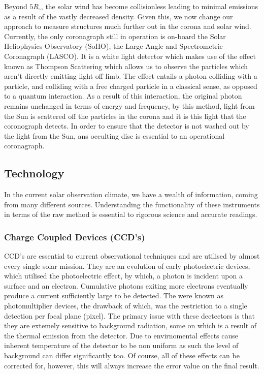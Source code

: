 Beyond $5 R_\circ$, the solar wind has become collisionless leading to minimal emissions as a result of the vastly decreased density.
Given this, we now change our approach to measure structures much further out in the corona and solar wind.
Currently, the only coronagraph still in operation is on-board the Solar Heliophysics Observatory (SoHO), the Large Angle and Spectrometric Coronagraph (LASCO). 
It is a white light detector which makes use of the effect known as Thompson Scattering which allows us to observe the particles which aren't directly emitting light off limb.
The effect entails a photon colliding with a particle, and colliding with a free charged particle in a classical sense, as opposed to a quantum interaction.
As a result of this interaction, the original photon remains unchanged in terms of energy and frequency, by this method, light from the Sun is scattered off the particles in the corona and it is this light that the coronograph detects.
In order to ensure that the detector is not washed out by the light from the Sun, ans occulting disc is essential to an operational coronagraph.


\subsection{Technology}

In the current solar observation climate, we have a wealth of information, coming from many different sources.
Understanding the functionality of these instruments in terms of the raw method is essential to rigorous science and accurate readings.

\subsubsection{Charge Coupled Devices (CCD's)}

CCD's are essential to current observational techniques and are utilised by almost every single solar mission.
They are an evolution of early photoelectric devices, which utilised the photoelectric effect, by which, a photon is incident upon a surface and an electron.
Cumulative photons exiting more electrons eventually produce a current sufficiently large to be detected.
The were known as photomultiplier devices, the drawback of which, was the restriction to a single detection per focal plane (pixel).
The primary issue with these dectectors is that they are extemely sensitive to background radiation, some on which is a result of the thermal emission from the detector.
Due to envirnomental effects cause inherent temperature of the detector to be non uniform as such the level of background can differ significantly too.
Of course, all of these effects can be corrected for, however, this will always increase the error value on the final result.

